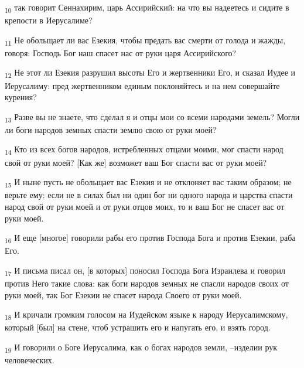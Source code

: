 \begin{tcolorbox}
\textsubscript{10} так говорит Сеннахирим, царь Ассирийский: на что вы надеетесь и сидите в крепости в Иерусалиме?
\end{tcolorbox}
\begin{tcolorbox}
\textsubscript{11} Не обольщает ли вас Езекия, чтобы предать вас смерти от голода и жажды, говоря: Господь Бог наш спасет нас от руки царя Ассирийского?
\end{tcolorbox}
\begin{tcolorbox}
\textsubscript{12} Не этот ли Езекия разрушил высоты Его и жертвенники Его, и сказал Иудее и Иерусалиму: пред жертвенником единым поклоняйтесь и на нем совершайте курения?
\end{tcolorbox}
\begin{tcolorbox}
\textsubscript{13} Разве вы не знаете, что сделал я и отцы мои со всеми народами земель? Могли ли боги народов земных спасти землю свою от руки моей?
\end{tcolorbox}
\begin{tcolorbox}
\textsubscript{14} Кто из всех богов народов, истребленных отцами моими, мог спасти народ свой от руки моей? [Как же] возможет ваш Бог спасти вас от руки моей?
\end{tcolorbox}
\begin{tcolorbox}
\textsubscript{15} И ныне пусть не обольщает вас Езекия и не отклоняет вас таким образом; не верьте ему: если не в силах был ни один бог ни одного народа и царства спасти народ свой от руки моей и от руки отцов моих, то и ваш Бог не спасет вас от руки моей.
\end{tcolorbox}
\begin{tcolorbox}
\textsubscript{16} И еще [многое] говорили рабы его против Господа Бога и против Езекии, раба Его.
\end{tcolorbox}
\begin{tcolorbox}
\textsubscript{17} И письма писал он, [в которых] поносил Господа Бога Израилева и говорил против Него такие слова: как боги народов земных не спасли народов своих от руки моей, так Бог Езекии не спасет народа Своего от руки моей.
\end{tcolorbox}
\begin{tcolorbox}
\textsubscript{18} И кричали громким голосом на Иудейском языке к народу Иерусалимскому, который [был] на стене, чтоб устрашить его и напугать его, и взять город.
\end{tcolorbox}
\begin{tcolorbox}
\textsubscript{19} И говорили о Боге Иерусалима, как о богах народов земли, --изделии рук человеческих.
\end{tcolorbox}
